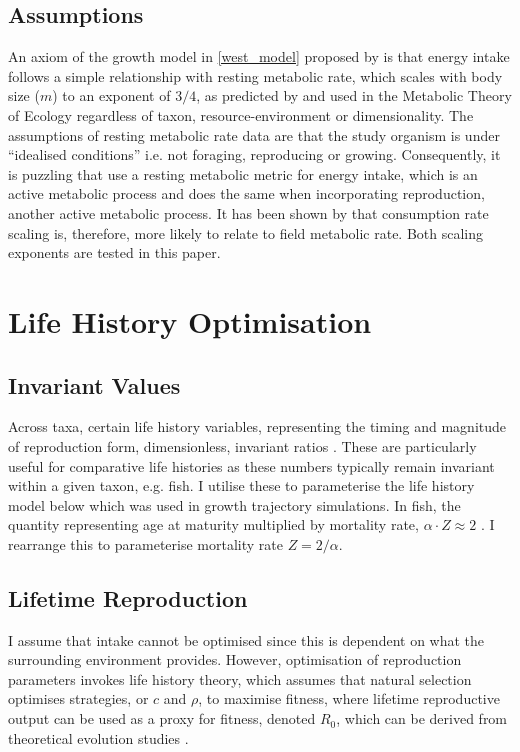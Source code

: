 \documentclass[a4paper]{article} %
\begin{document}
\subsection{Assumptions}
An axiom of the growth model in \cref{west_model} proposed by \textcite{West2001} is that energy intake follows a simple relationship with resting metabolic rate, which scales with body size ($m$) to an exponent of $3/4$, as predicted by \textcite{West1997} and used in the Metabolic Theory of Ecology \autocite{Brown2004} regardless of taxon, resource-environment or dimensionality. The assumptions of resting metabolic rate data are that the study organism is under ``idealised conditions'' i.e. not foraging, reproducing or growing. Consequently, it is puzzling that \textcite{West2001} use a resting metabolic metric for energy intake, which is an active metabolic process and \textcite{Charnov2001} does the same when incorporating reproduction, another active metabolic process. It has been shown by \textcite{Pawar2012} that consumption rate scaling is, therefore, more likely to relate to field metabolic rate. Both scaling exponents are tested in this paper.


\section{Life History Optimisation}
\subsection{Invariant Values}
Across taxa, certain life history variables, representing the timing and magnitude of reproduction form, dimensionless, invariant ratios \autocite{Charnov1993}. These are particularly useful for comparative life histories as these numbers typically remain invariant within a given taxon, e.g. fish. I utilise these to parameterise the life history model below which was used in growth trajectory simulations. In fish, the quantity representing age at maturity multiplied by mortality rate, $\alpha\cdot Z \approx 2$ \autocite{Charnov2001}. I rearrange this to parameterise mortality rate $Z = 2/{\alpha}$.

\subsection{Lifetime Reproduction}
I assume that intake cannot be optimised since this is dependent on what the surrounding environment provides. However, optimisation of reproduction parameters invokes life history theory, which assumes that natural selection optimises strategies, or $c$ and $\rho$, to maximise fitness, where lifetime reproductive output can be used as a proxy for fitness, denoted $R_0$, which can be derived from theoretical evolution studies \autocite{Charnov2001, stearns1992evolution}.
\end{document}
